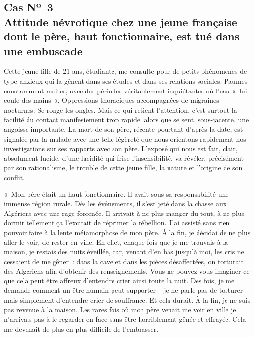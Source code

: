 \documentclass[french,twoside]{book} %
\begin{document}
\subsection[{Cas Nº 3. Attitude névrotique chez une jeune française dont le père, haut fonctionnaire, est tué dans une embuscade}]{Cas Nº 3 \\
Attitude névrotique chez une jeune française dont le père, haut fonctionnaire, est tué dans une embuscade}
\noindent Cette jeune fille de 21 ans, étudiante, me consulte pour de petits phénomènes de type anxieux qui la gênent dans ses études et dans ses relations sociales. Paumes constamment moites, avec des périodes véritablement inquiétantes où l’eau « lui coule des mains ». Oppressions thoraciques accompagnées de migraines nocturnes. Se ronge les ongles. Mais ce qui retient l’attention, c’est surtout la facilité du contact manifestement trop rapide, alors que se sent, sous-jacente, une angoisse importante. La mort de son père, récente pourtant d’après la date, est signalée par la malade avec une telle légèreté que nous orientons rapidement nos investigations sur ses rapports avec son père. L’exposé qui nous est fait, clair, absolument lucide, d’une lucidité qui frise l’insensibilité, va révéler, précisément par son rationalisme, le trouble de cette jeune fille, la nature et l’origine de son conflit.\par
\bigbreak
\noindent « Mon père était un haut fonctionnaire. Il avait sous sa responsabilité une immense région rurale. Dès les événements, il s’est jeté dans la chasse aux Algériens avec une rage forcenée. Il arrivait à ne plus manger du tout, à ne plus dormir tellement ça l’excitait de réprimer la rébellion. J’ai assisté sans rien pouvoir faire à la lente métamorphose de mon père. À la fin, je décidai de ne plus aller le voir, de rester en ville. En effet, chaque fois que je me trouvais à la maison, je restais des nuits éveillée, car, venant d’en bas jusqu’à moi, les cris ne cessaient de me gêner : dans la cave et dans les pièces désaffectées, on torturait   des Algériens afin d’obtenir des renseignements. Vous ne pouvez vous imaginer ce que cela peut être affreux d’entendre crier ainsi toute la nuit. Des fois, je me demande comment un être humain peut supporter – je ne parle pas de torturer – mais simplement d’entendre crier de souffrance. Et cela durait. À la fin, je ne suis pas revenue à la maison. Les rares fois où mon père venait me voir en ville je n’arrivais pas à le regarder en face sans être horriblement gênée et effrayée. Cela me devenait de plus en plus difficile de l’embrasser.\par
\end{document}
